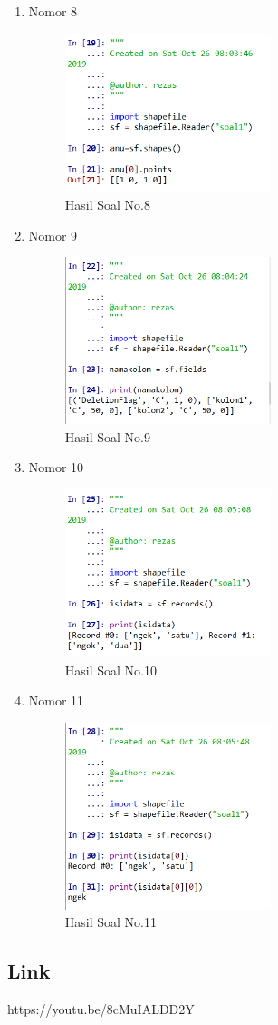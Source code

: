 \begin{enumerate}
	\item Nomor 8
	
	\begin{figure}[H]
		\includegraphics[width=6cm]{figures/Tugas3/1174084/8.png}
		\centering
		\caption{Hasil Soal No.8}
	\end{figure}
	\item Nomor 9
	
	\begin{figure}[H]
		\includegraphics[width=6cm]{figures/Tugas3/1174084/9.png}
		\centering
		\caption{Hasil Soal No.9}
	\end{figure}
	\item Nomor 10
	
	\begin{figure}[H]
		\includegraphics[width=6cm]{figures/Tugas3/1174084/10.png}
		\centering
		\caption{Hasil Soal No.10}
	\end{figure}
	\item Nomor 11
	
	\begin{figure}[H]
		\includegraphics[width=6cm]{figures/Tugas3/1174084/11.png}
		\centering
		\caption{Hasil Soal No.11}
	\end{figure}
\end{enumerate}
\subsection{Link}
https://youtu.be/8cMuIALDD2Y